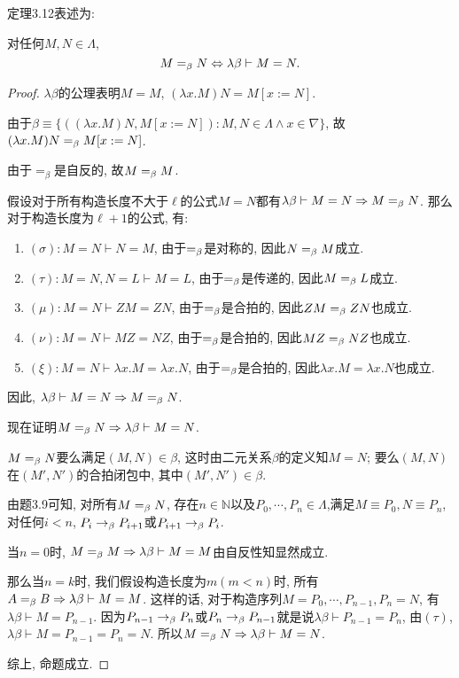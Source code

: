 定理3.12表述为:

对任何$M,N\in\Lambda$,$$M=_{\beta} N\Leftrightarrow \lambda\beta\vdash M=N.$$
\begin{proof}
    $\lambda\beta$的公理表明$M=M$, $(\lambda x.M)N=M[x:=N]$. 
	
	由于$\beta\equiv\{((\lambda x.M)N, M[x:=N]):M,N\in\Lambda\land x\in \nabla\}$, 故$(\lambda x.M)N=_{\beta} M[x:=N]$.
	
	由于$=_{\beta}$是自反的, 故$M=_{\beta} M$.
	
	假设对于所有构造长度不大于$\ell$的公式$M=N$都有$\lambda\beta\vdash M=N\Rightarrow M=_{\beta} N$. 那么对于构造长度为$\ell+1$的公式, 有:
	
	\begin{enumerate}
		\item $(\sigma): M=N\vdash N=M$, 由于$=_{\beta}$是对称的, 因此$N=_{\beta} M$成立.
		\item $(\tau): M=N,N=L\vdash M=L$, 由于$=_{\beta}$是传递的, 因此$M=_{\beta} L$成立.
		\item $(\mu): M=N\vdash ZM=ZN$, 由于$=_{\beta}$是合拍的, 因此$ZM=_{\beta} ZN$也成立.
		\item $(\nu): M=N\vdash MZ=NZ$, 由于$=_{\beta}$是合拍的, 因此$MZ=_{\beta} NZ$也成立.
		\item $(\xi): M=N\vdash \lambda x.M=\lambda x.N$, 由于$=_{\beta}$是合拍的, 因此$\lambda x.M=\lambda x.N$也成立.
	\end{enumerate}
	
	因此, $\lambda\beta\vdash M=N\Rightarrow M=_{\beta} N$.
	
	现在证明$M=_{\beta} N\Rightarrow \lambda\beta\vdash M=N$.
	
	$M=_{\beta} N$要么满足$(M,N)\in\beta$, 这时由二元关系$\beta$的定义知$M=N$; 要么$(M,N)$在${(M',N')}$的合拍闭包中, 其中$(M',N')\in\beta$.
	
	由题3.9可知, 对所有$M=_{\beta} N$, 存在$n\in\mathbb{N}$以及$P_0,\cdots,P_n\in\Lambda$,满足$M\equiv P_0, N\equiv P_n$, 对任何$i<n$, $P_i\rightarrow_{\beta} P_{i+1}$或$P_{i+1}\rightarrow_{\beta} P_i$.
	
	当$n=0$时, $M=_{\beta} M\Rightarrow \lambda\beta\vdash M=M$由自反性知显然成立.
	
	那么当$n=k$时, 我们假设构造长度为$m(m<n)$时, 所有$A=_{\beta} B\Rightarrow \lambda\beta\vdash M=M$. 这样的话, 对于构造序列$M=P_0,\cdots,P_{n-1},P_n=N$, 有$\lambda\beta\vdash M=P_{n-1}$. 因为$P_{n-1}\rightarrow_{\beta} P_n$或$P_n\rightarrow_{\beta} P_{n-1}$就是说$\lambda\beta\vdash P_{n-1}=P_n$, 由$(\tau)$, $\lambda\beta\vdash M=P_{n-1}=P_n=N$. 所以$M=_{\beta} N\Rightarrow \lambda\beta\vdash M=N$.
	
	综上, 命题成立.
\end{proof}